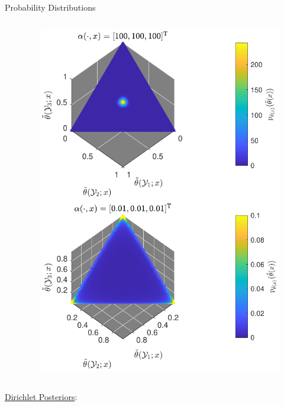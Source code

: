 \documentclass[final]{beamer}
\begin{document}
\begin{frame}{}
\begin{columns}[T]
\begin{column}{.34\linewidth}
\begin{block}{Probability Distributions}
\begin{columns}[c]
\begin{column}{.49\linewidth}
\end{column}
\begin{column}{.44\linewidth}


\begin{figure}
\centering
\includegraphics[width=0.9\linewidth]{P_theta_tilde.pdf}
\end{figure}

\end{column}
\end{columns}



\vspace{1cm}




\begin{columns}[c]
\begin{column}{.49\linewidth}

\underline{Dirichlet Posteriors}:


\end{column}
\end{columns}
\end{block}
\end{column}
\end{columns}
\end{frame}
\end{document}
